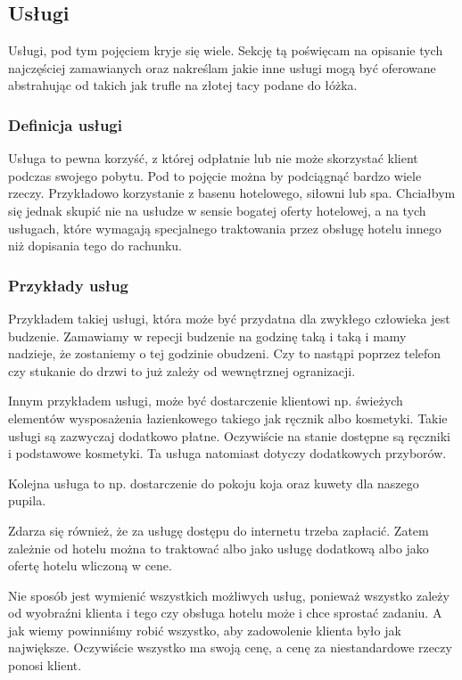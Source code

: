\documentclass[12pt, a4paper]{article}
\begin{document}
\subsection{Usługi}
Usługi, pod tym pojęciem kryje się wiele. Sekcję tą poświęcam na opisanie tych
najczęściej zamawianych oraz nakreślam jakie inne usługi mogą być oferowane
abstrahując od takich jak trufle na złotej tacy podane do łóżka.

\subsubsection{Definicja usługi}
Usługa to pewna korzyść, z której odpłatnie lub nie może skorzystać klient
podczas swojego pobytu. Pod to pojęcie można by podciągnąć bardzo wiele rzeczy.
Przykładowo korzystanie z basenu hotelowego, siłowni lub spa. Chciałbym się
jednak skupić nie na usłudze w sensie bogatej oferty hotelowej, a na tych
usługach, które wymagają specjalnego traktowania przez obsługę hotelu innego niż
dopisania tego do rachunku.
\subsubsection{Przykłady usług}
Przykładem takiej usługi, która może być przydatna dla zwykłego człowieka jest
budzenie. Zamawiamy w repecji budzenie na godzinę taką i taką i mamy nadzieje,
że zostaniemy o tej godzinie obudzeni. Czy to nastąpi poprzez telefon czy
stukanie do drzwi to już zależy od wewnętrznej ogranizacji.

Innym przykładem usługi, może być dostarczenie klientowi np. świeżych elementów
wysposażenia łazienkowego takiego jak ręcznik albo kosmetyki. Takie usługi są
zazwyczaj dodatkowo płatne. Oczywiście na stanie dostępne są ręczniki i
podstawowe kosmetyki. Ta usługa natomiast dotyczy dodatkowych przyborów.

Kolejna usługa to np. dostarczenie do pokoju koja oraz kuwety dla naszego
pupila.

Zdarza się również, że za usługę dostępu do internetu trzeba zapłacić. Zatem
zależnie od hotelu można to traktować albo jako usługę dodatkową albo jako
ofertę hotelu wliczoną w cene.

Nie sposób jest wymienić wszystkich możliwych usług, ponieważ wszystko zależy od
wyobraźni klienta i tego czy obsługa hotelu może i chce sprostać zadaniu. A jak
wiemy powinniśmy robić wszystko, aby zadowolenie klienta było jak największe.
Oczywiście wszystko ma swoją cenę, a cenę za niestandardowe rzeczy ponosi
klient.
\end{document}
